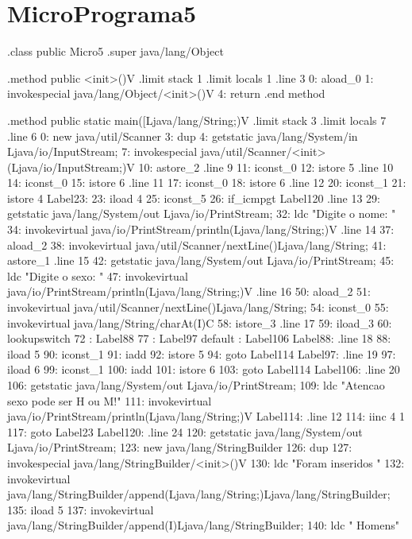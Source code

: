 \documentclass[12pt,a4paper,twoside]{report}
\begin{document}
\section{MicroPrograma5}
\begin{terminal}
.class public Micro5
.super java/lang/Object

.method public <init>()V
  .limit stack 1
  .limit locals 1
  .line 3
  0: aload_0
  1: invokespecial java/lang/Object/<init>()V
  4: return
.end method

.method public static main([Ljava/lang/String;)V
  .limit stack 3
  .limit locals 7
  .line 6
  0: new java/util/Scanner
  3: dup
  4: getstatic java/lang/System/in Ljava/io/InputStream;
  7: invokespecial java/util/Scanner/<init>(Ljava/io/InputStream;)V
  10: astore_2
  .line 9
  11: iconst_0
  12: istore 5
  .line 10
  14: iconst_0
  15: istore 6
  .line 11
  17: iconst_0
  18: istore 6
  .line 12
  20: iconst_1
  21: istore 4
Label23:
  23: iload 4
  25: iconst_5
  26: if_icmpgt Label120
  .line 13
  29: getstatic java/lang/System/out Ljava/io/PrintStream;
  32: ldc "Digite o nome: "
  34: invokevirtual java/io/PrintStream/println(Ljava/lang/String;)V
  .line 14
  37: aload_2
  38: invokevirtual java/util/Scanner/nextLine()Ljava/lang/String;
  41: astore_1
  .line 15
  42: getstatic java/lang/System/out Ljava/io/PrintStream;
  45: ldc "Digite o sexo: "
  47: invokevirtual java/io/PrintStream/println(Ljava/lang/String;)V
  .line 16
  50: aload_2
  51: invokevirtual java/util/Scanner/nextLine()Ljava/lang/String;
  54: iconst_0
  55: invokevirtual java/lang/String/charAt(I)C
  58: istore_3
  .line 17
  59: iload_3
  60: lookupswitch
          72 : Label88
          77 : Label97
          default : Label106
Label88:
  .line 18
  88: iload 5
  90: iconst_1
  91: iadd
  92: istore 5
  94: goto Label114
Label97:
  .line 19
  97: iload 6
  99: iconst_1
  100: iadd
  101: istore 6
  103: goto Label114
Label106:
  .line 20
  106: getstatic java/lang/System/out Ljava/io/PrintStream;
  109: ldc "Atencao sexo pode ser H ou M!"
  111: invokevirtual java/io/PrintStream/println(Ljava/lang/String;)V
Label114:
  .line 12
  114: iinc 4 1
  117: goto Label23
Label120:
  .line 24
  120: getstatic java/lang/System/out Ljava/io/PrintStream;
  123: new java/lang/StringBuilder
  126: dup
  127: invokespecial java/lang/StringBuilder/<init>()V
  130: ldc "Foram inseridos "
  132: invokevirtual java/lang/StringBuilder/append(Ljava/lang/String;)Ljava/lang/StringBuilder;
  135: iload 5
  137: invokevirtual java/lang/StringBuilder/append(I)Ljava/lang/StringBuilder;
  140: ldc " Homens"

\end{terminal}
\end{document}
